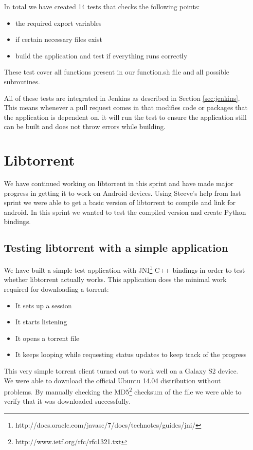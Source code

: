 		In total we have created 14 tests that checks the following points:
		
		\begin{itemize}
			\item the required export variables
			\item if certain necessary files exist
			\item build the application and test if everything runs correctly
		\end{itemize}
		
		These test cover all functions present in our function.sh file and all possible subroutines. 
		
		All of these tests are integrated in Jenkins as described in Section \ref{sec:jenkins}. This means whenever a pull request comes in that modifies code or packages that the application is dependent on, it will run the test to ensure the application still can be built and does not throw errors while building.
	
	\section{Libtorrent}
		We have continued working on libtorrent in this sprint and have made major progress in getting it to work on Android devices. Using Steeve's help from last sprint we were able to get a basic version of libtorrent to compile and link for android. In this sprint we wanted to test the compiled version and create Python bindings.
		
		\subsection{Testing libtorrent with a simple application}
			We have built a simple test application with JNI\footnote{http://docs.oracle.com/javase/7/docs/technotes/guides/jni/} C++ bindings in order to test whether libtorrent actually works. This application does the minimal work required for downloading a torrent:
			\begin{itemize}
				\item It sets up a session
				\item It starts listening
				\item It opens a torrent file
				\item It keeps looping while requesting status updates to keep track of the progress
			\end{itemize}
			This very simple torrent client turned out to work well on a Galaxy S2 device. We were able to download the official Ubuntu 14.04 distribution without problems. By manually checking the MD5\footnote{http://www.ietf.org/rfc/rfc1321.txt} checksum of the file we were able to verify that it was downloaded successfully.
		
